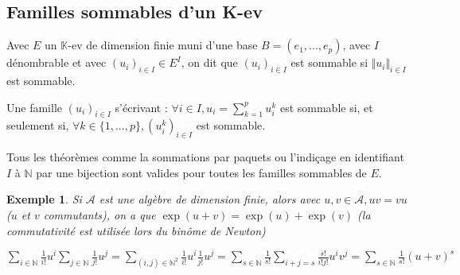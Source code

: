 \documentclass[a4paper,12pt]{book}
\newcommand{\Def}[2]{\begin{tcolorbox}[sharp corners, colback=white,colframe=blue!90!black!75, title=Définition : #1]#2\end{tcolorbox}}
\newcommand{\Prop}[2]{\begin{tcolorbox}[sharp corners, colback=white,colframe=red!90!black!75, title=Proposition : #1]#2\end{tcolorbox}}
\newtheorem{Exe}{Exemple}[section]
\def\N{\mathbb{N}}
\def\K{\mathbb{K}}
\begin{document}
\subsection{Familles sommables d'un K-ev}
\Def{Familles sommables d'un $K$-ev de dimension finie}{Avec $E$ un $\K$-ev de dimension finie muni d'une base $B=(e_1,...,e_p)$, avec $I$ dénombrable et avec $(u_i)_{i\in I}\in E^I$, on dit que $(u_i)_{i\in I}$ est sommable si $\Vert u_i\Vert_{i\in I}$ est sommable.}
\Prop{Sommabilité des familles coordonnées}{Une famille $(u_i)_{i\in I}$ s'écrivant : $\forall i\in I, u_i=\sum\limits_{k=1}^p u_i^k$ est sommable si, et seulement si, $\forall k\in\{1,...,p\}, (u_i^k)_{i\in I}$ est sommable.}
Tous les théorèmes comme la sommations par paquets ou l'indiçage en identifiant $I$ à $\N$ par une bijection sont valides pour toutes les familles sommables de $E$.
\begin{Exe}
Si $\mathcal{A}$ est une algèbre de dimension finie, alors avec $u,v\in\mathcal{A}, uv=vu$ ($u$ et $v$ commutants), on a que $\exp(u+v)=\exp(u)+\exp(v)$ (la commutativité est utilisée lors du binôme de Newton)
\par $\sum\limits_{i\in\N}\frac{1}{i!}u^i\sum\limits_{j\in\N}\frac{1}{j!}u^j = \sum\limits_{(i,j)\in\N^2}\frac{1}{i!}u^i\frac{1}{j!}u^j=\sum\limits_{s\in\N}\frac{1}{s!}\sum\limits_{i+j=s}\frac{s!}{i!j!}u^iv^j=\sum\limits_{s\in\N}\frac{1}{s!}(u+v)^s$
\end{Exe}
\end{document}
